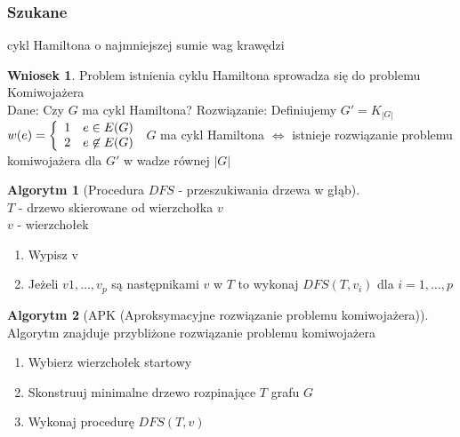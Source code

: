 \documentclass[12pt,a4paper]{article}
\theoremstyle{definition}
\newtheorem{wniosek}{Wniosek}
\newtheorem{algo}{Algorytm}
\begin{document}
\subsubsection{Szukane} cykl Hamiltona o najmniejszej sumie wag krawędzi
\begin{wniosek}
Problem istnienia cyklu Hamiltona sprowadza się do problemu Komiwojażera\\
Dane: Czy $G$ ma cykl Hamiltona?
Rozwiązanie: Definiujemy $G' = K_{|G|}$\\
$w(e) = \left\lbrace
	\begin{array}{l l}
		1 & e\in E(G)\\
		2 & e\not\in E(G)
	\end{array}\right.
$
$G$ ma cykl Hamiltona $\Leftrightarrow$ istnieje rozwiązanie problemu komiwojażera dla $G'$ w wadze równej $|G|$
\end{wniosek}

\begin{algo}[Procedura $DFS$ - przeszukiwania drzewa w głąb]~\\
$T$ - drzewo skierowane od wierzchołka $v$\\
$v$ - wierzchołek
\begin{enumerate}
	\item Wypisz v
	\item Jeżeli $v1, \dots, v_p$ są następnikami $v$ w $T$ to wykonaj $DFS(T, v_i)$ dla $i = 1, \dots, p$
\end{enumerate}
\end{algo}

\begin{algo}[APK (Aproksymacyjne rozwiązanie problemu komiwojażera)]~\\\label{algo:apk}
Algorytm znajduje przybliżone rozwiązanie problemu komiwojażera
\begin{enumerate}
	\item Wybierz wierzchołek startowy
	\item Skonstruuj minimalne drzewo rozpinające $T$ grafu $G$
	\item Wykonaj procedurę $DFS(T, v)$
\end{enumerate}
\end{algo}
\end{document}
